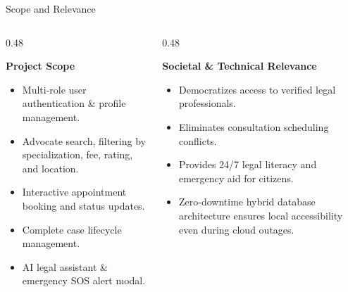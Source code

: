 \documentclass[10pt,aspectratio=169]{beamer}
\begin{document}
\begin{frame}{Scope and Relevance}
  \begin{columns}[T]
    \begin{column}{0.48\textwidth}
      \begin{block}{\textbf{Project Scope}}
        \begin{itemize}
          \item Multi-role user authentication \& profile management.
          \item Advocate search, filtering by specialization, fee, rating, and location.
          \item Interactive appointment booking and status updates.
          \item Complete case lifecycle management.
          \item AI legal assistant & emergency SOS alert modal.
        \end{itemize}
      \end{block}
    \end{column}
    
    \begin{column}{0.48\textwidth}
      \begin{block}{\textbf{Societal & Technical Relevance}}
        \begin{itemize}
          \item Democratizes access to verified legal professionals.
          \item Eliminates consultation scheduling conflicts.
          \item Provides 24/7 legal literacy and emergency aid for citizens.
          \item Zero-downtime hybrid database architecture ensures local accessibility even during cloud outages.
        \end{itemize}
      \end{block}
    \end{column}
  \end{columns}
\end{frame}
\end{document}
